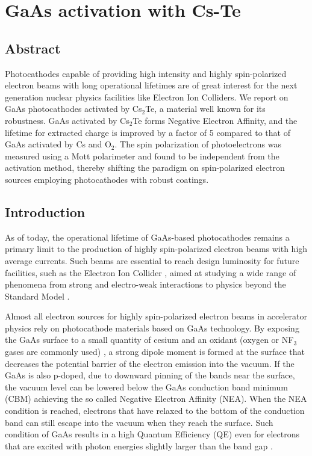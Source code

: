 \chapter{G\lowercase{a}A\lowercase{s} activation with C\lowercase{s}-T\lowercase{e}}
\section{Abstract}
Photocathodes capable of providing high intensity and highly spin-polarized electron beams with long operational lifetimes are of great interest for the next generation nuclear physics facilities like Electron Ion Colliders. We report on GaAs photocathodes activated by Cs$_2$Te, a material well known for its robustness. GaAs activated by Cs$_2$Te forms Negative Electron Affinity, and the lifetime for extracted charge is improved by a factor of 5 compared to that of GaAs activated by Cs and O$_2$. The spin polarization of photoelectrons was measured using a Mott polarimeter and found to be independent from the activation method, thereby shifting the paradigm on spin-polarized electron sources employing photocathodes with robust coatings.

\section{Introduction}
As of today, the operational lifetime of GaAs-based photocathodes remains a primary limit to the production of highly spin-polarized electron beams with high average currents. Such beams are essential to reach design luminosity for future facilities, such as the Electron Ion Collider \cite{eic}, aimed at studying a wide range of phenomena from strong and electro-weak interactions to physics beyond the Standard Model \cite{lrpns,nsac,mccarter2014_MeasurementElectronBeam}.

Almost all electron sources for highly spin-polarized electron beams in accelerator physics rely on photocathode materials based on GaAs technology. By exposing the GaAs surface to a small quantity of cesium and an oxidant (oxygen or NF$_3$ gases are commonly used) \cite{ciccacci1991_ComparativeStudyPreparation}, a strong dipole moment is formed at the surface that decreases the potential barrier of the electron emission into the vacuum. If the GaAs is also p-doped, due to downward pinning of the bands near the surface, the vacuum level can be lowered below the GaAs conduction band minimum (CBM) achieving the so called Negative Electron Affinity (NEA). When the NEA condition is reached, electrons that have relaxed to the bottom of the conduction band can still escape into the vacuum when they reach the surface. Such condition of GaAs results in a high Quantum Efficiency (QE) even for electrons that are excited with photon energies slightly larger than the band gap \cite{pierce1980_GaAsSpinPolarized}.

